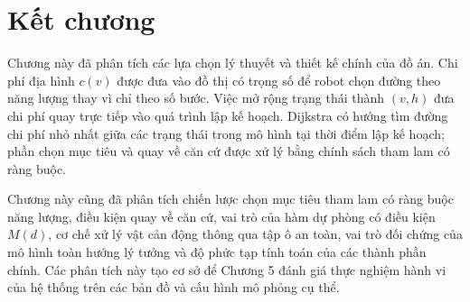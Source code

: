 \documentclass[../DoAn.tex]{subfiles}
\begin{document}
\section{Kết chương}

Chương này đã phân tích các lựa chọn lý thuyết và thiết kế chính của đồ án. Chi phí địa hình $c(v)$ được đưa vào đồ thị có trọng số để robot chọn đường theo năng lượng thay vì chỉ theo số bước. Việc mở rộng trạng thái thành $(v,h)$ đưa chi phí quay trực tiếp vào quá trình lập kế hoạch. Dijkstra có hướng tìm đường chi phí nhỏ nhất giữa các trạng thái trong mô hình tại thời điểm lập kế hoạch; phần chọn mục tiêu và quay về căn cứ được xử lý bằng chính sách tham lam có ràng buộc.

Chương này cũng đã phân tích chiến lược chọn mục tiêu tham lam có ràng buộc năng lượng, điều kiện quay về căn cứ, vai trò của hàm dự phòng có điều kiện $M(d)$, cơ chế xử lý vật cản động thông qua tập ô an toàn, vai trò đối chứng của mô hình toàn hướng lý tưởng và độ phức tạp tính toán của các thành phần chính. Các phân tích này tạo cơ sở để Chương 5 đánh giá thực nghiệm hành vi của hệ thống trên các bản đồ và cấu hình mô phỏng cụ thể.
\end{document}
